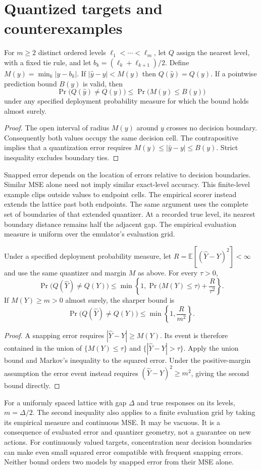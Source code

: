\section{Quantized targets and counterexamples}
\label{app:quantization}
\begin{proposition}
For $m\geq2$ distinct ordered levels $\ell_1<\cdots<\ell_m$, let $Q$ assign the nearest
level, with a fixed tie rule, and let
$b_k=(\ell_k+\ell_{k+1})/2$. Define
$M(y)=\min_k|y-b_k|$. If $|\hat y-y|<M(y)$ then
$Q(\hat y)=Q(y)$. If a pointwise prediction bound $B(y)$ is valid, then
\[
 \Pr\bigl(Q(\hat y)\ne Q(y)\bigr)
 \leq\Pr\bigl(M(y)\leq B(y)\bigr)
\]
under any specified deployment probability measure for which the bound holds
almost surely.
\end{proposition}
\begin{proof}
The open interval of radius $M(y)$ around $y$ crosses no decision boundary.
Consequently both values occupy the same decision cell. The contrapositive
implies that a quantization error requires $M(y)\leq|\hat y-y|\leq B(y)$.
Strict inequality excludes boundary ties.
\end{proof}
Snapped error depends on the location of errors relative to decision boundaries.
Similar MSE alone need not imply similar exact-level accuracy.
This finite-level example clips outside values to endpoint cells. The empirical
scorer instead extends the lattice past both endpoints. The same argument uses
the complete set of boundaries of that extended quantizer. At a recorded true
level, its nearest boundary distance remains half the adjacent gap. The
empirical evaluation measure is uniform over the emulator's evaluation grid.

\begin{proposition}
Under a specified deployment probability measure, let
$R=\mathbb E[(\hat Y-Y)^2]<\infty$ and use the same quantizer and margin
$M$ as above. For every $\tau>0$,
\[
 \Pr\bigl(Q(\hat Y)\ne Q(Y)\bigr)
 \leq \min\left\{1,\Pr\bigl(M(Y)\leq\tau\bigr)+\frac{R}{\tau^2}\right\}.
\]
If $M(Y)\geq m>0$ almost surely, the sharper bound is
\[
 \Pr\bigl(Q(\hat Y)\ne Q(Y)\bigr)
 \leq\min\left\{1,\frac{R}{m^2}\right\}.
\]
\end{proposition}
\begin{proof}
A snapping error requires $|\hat Y-Y|\geq M(Y)$. Its event is therefore
contained in the union of $\{M(Y)\leq\tau\}$ and
$\{|\hat Y-Y|>\tau\}$. Apply the union bound and Markov's inequality to
the squared error. Under the positive-margin assumption the error event instead
requires $(\hat Y-Y)^2\geq m^2$, giving the second bound directly.
\end{proof}
For a uniformly spaced lattice with gap $\Delta$ and true responses on its
levels, $m=\Delta/2$. The second inequality also applies to a finite evaluation
grid by taking its empirical measure and continuous MSE. It may be vacuous.
It is a consequence of evaluated error and quantizer geometry, not a guarantee
on new actions. For continuously valued targets, concentration near decision
boundaries can make even small squared error compatible with frequent snapping
errors. Neither bound orders two models by snapped error from their MSE alone.

